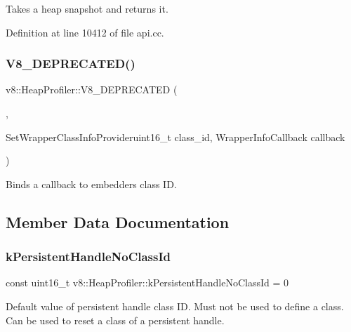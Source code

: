 Takes a heap snapshot and returns it. 

Definition at line 10412 of file api.\+cc.

\mbox{\label{classv8_1_1HeapProfiler_af41ccd8baea0da8d701e565b7b2e8eab}} 
\subsubsection{\texorpdfstring{V8\+\_\+\+D\+E\+P\+R\+E\+C\+A\+T\+E\+D()}{V8\_DEPRECATED()}}
{\footnotesize\ttfamily v8\+::\+Heap\+Profiler\+::\+V8\+\_\+\+D\+E\+P\+R\+E\+C\+A\+T\+ED (\begin{DoxyParamCaption}\item[{\char`\"{}Use Add\+Build\+Embedder\+Graph\+Callback to provide info about embedder nodes\char`\"{}}]{,  }\item[{void }]{Set\+Wrapper\+Class\+Info\+Provideruint16\+\_\+t class\+\_\+id, Wrapper\+Info\+Callback callback }\end{DoxyParamCaption})}

Binds a callback to embedder\textquotesingle{}s class ID. 

\subsection{Member Data Documentation}
\mbox{\label{classv8_1_1HeapProfiler_a272c9af3ea5cd90a2737af3d22a7eb78}} 
\subsubsection{\texorpdfstring{k\+Persistent\+Handle\+No\+Class\+Id}{kPersistentHandleNoClassId}}
{\footnotesize\ttfamily const uint16\+\_\+t v8\+::\+Heap\+Profiler\+::k\+Persistent\+Handle\+No\+Class\+Id = 0\hspace{0.3cm}{\ttfamily [static]}}

Default value of persistent handle class ID. Must not be used to define a class. Can be used to reset a class of a persistent handle. 

